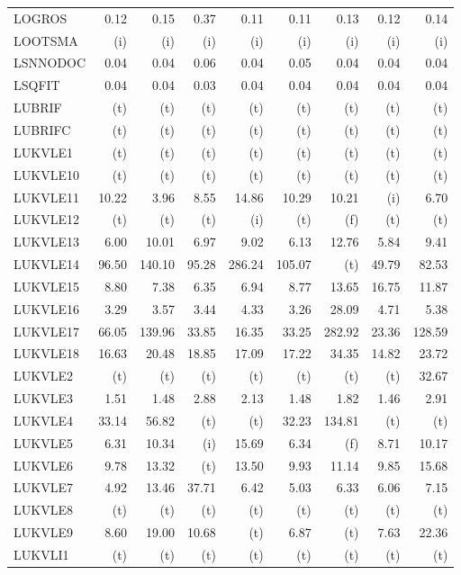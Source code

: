 \documentclass[11pt,twoside]{article}
\begin{document}
{\begin{longtable}[c]{|l|r|r|r|r|r|r|r|r|}
LOGROS & 0.12 & 0.15 & 0.37 & 0.11 & 0.11 & 0.13 & 0.12 & 0.14 \\
LOOTSMA & (i) & (i) & (i) & (i) & (i) & (i) & (i) & (i) \\
LSNNODOC & 0.04 & 0.04 & 0.06 & 0.04 & 0.05 & 0.04 & 0.04 & 0.04 \\
LSQFIT & 0.04 & 0.04 & 0.03 & 0.04 & 0.04 & 0.04 & 0.04 & 0.04 \\
LUBRIF & (t) & (t) & (t) & (t) & (t) & (t) & (t) & (t) \\
LUBRIFC & (t) & (t) & (t) & (t) & (t) & (t) & (t) & (t) \\
LUKVLE1 & (t) & (t) & (t) & (t) & (t) & (t) & (t) & (t) \\
LUKVLE10 & (t) & (t) & (t) & (t) & (t) & (t) & (t) & (t) \\
LUKVLE11 & 10.22 & 3.96 & 8.55 & 14.86 & 10.29 & 10.21 & (i) & 6.70 \\
LUKVLE12 & (t) & (t) & (t) & (i) & (t) & (f) & (t) & (t) \\
LUKVLE13 & 6.00 & 10.01 & 6.97 & 9.02 & 6.13 & 12.76 & 5.84 & 9.41 \\
LUKVLE14 & 96.50 & 140.10 & 95.28 & 286.24 & 105.07 & (t) & 49.79 & 82.53 \\
LUKVLE15 & 8.80 & 7.38 & 6.35 & 6.94 & 8.77 & 13.65 & 16.75 & 11.87 \\
LUKVLE16 & 3.29 & 3.57 & 3.44 & 4.33 & 3.26 & 28.09 & 4.71 & 5.38 \\
LUKVLE17 & 66.05 & 139.96 & 33.85 & 16.35 & 33.25 & 282.92 & 23.36 & 128.59 \\
LUKVLE18 & 16.63 & 20.48 & 18.85 & 17.09 & 17.22 & 34.35 & 14.82 & 23.72 \\
LUKVLE2 & (t) & (t) & (t) & (t) & (t) & (t) & (t) & 32.67 \\
LUKVLE3 & 1.51 & 1.48 & 2.88 & 2.13 & 1.48 & 1.82 & 1.46 & 2.91 \\
LUKVLE4 & 33.14 & 56.82 & (t) & (t) & 32.23 & 134.81 & (t) & (t) \\
LUKVLE5 & 6.31 & 10.34 & (i) & 15.69 & 6.34 & (f) & 8.71 & 10.17 \\
LUKVLE6 & 9.78 & 13.32 & (t) & 13.50 & 9.93 & 11.14 & 9.85 & 15.68 \\
LUKVLE7 & 4.92 & 13.46 & 37.71 & 6.42 & 5.03 & 6.33 & 6.06 & 7.15 \\
LUKVLE8 & (t) & (t) & (t) & (t) & (t) & (t) & (t) & (t) \\
LUKVLE9 & 8.60 & 19.00 & 10.68 & (t) & 6.87 & (t) & 7.63 & 22.36 \\
LUKVLI1 & (t) & (t) & (t) & (t) & (t) & (t) & (t) & (t) \\

\end{longtable}}
\end{document}

